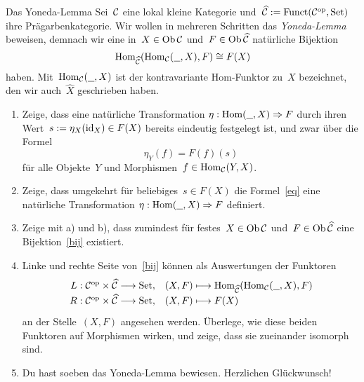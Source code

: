 \documentclass{pizzablatt}
\begin{document}

\begin{aufgabe}{Das Yoneda-Lemma}
Sei~$\mathcal{C}$ eine lokal kleine Kategorie und~$\widehat {\mathcal{C}} := \mathrm{Funct}(\mathcal{C}^{\mathrm{op}},\mathrm{Set})$
ihre Prägarbenkategorie. Wir wollen in mehreren Schritten das \emph{Yoneda-Lemma}
beweisen, demnach wir eine in~$X \in \operatorname{Ob} \mathcal{C}$ und~$F \in \operatorname{Ob} \widehat {\mathcal{C}}$
natürliche Bijektion
\begin{equation}\label{bij}\mathrm{Hom}_{\widehat{\mathcal{C}}}(\mathrm{Hom}_{\mathcal{C}}(\underline{\ \ }, X), F) \cong F(X)
\end{equation}
haben. Mit~$\mathrm{Hom}_{\mathcal{C}}(\underline{\ \ },X)$ ist der kontravariante Hom-Funktor zu~$X$
bezeichnet, den wir auch~$\widehat X$ geschrieben haben.
\begin{enumerate}
\item Zeige, dass eine natürliche Transformation $\eta : \mathrm{Hom}(\underline{\ \ }, X)
\Rightarrow F$ durch ihren Wert~$s := \eta_X(\mathrm{id}_X) \in F(X)$ bereits eindeutig
festgelegt ist, und zwar über die Formel
\begin{equation}\label{eq} \eta_Y(f) = F(f)(s) \end{equation}
für alle Objekte~$Y$ und Morphismen~$f \in \mathrm{Hom}_{\mathcal{C}}(Y,X)$.
\item Zeige, dass umgekehrt für beliebiges~$s \in F(X)$ die Formel~\eqref{eq} eine
natürliche Transformation $\eta : \mathrm{Hom}(\underline{\ \ }, X) \Rightarrow F$ definiert.
\item Zeige mit a) und b), dass zumindest für festes~$X \in \operatorname{Ob}\mathcal{C}$ und~$F \in
\operatorname{Ob}\widehat{\mathcal{C}}$ eine Bijektion~\eqref{bij} existiert.
\item Linke und rechte Seite von~\eqref{bij} können als Auswertungen der
Funktoren
\[ \renewcommand{\arraystretch}{1.3}\begin{array}{@{}rl@{}}
  L : \C^\op \times \widehat\C \longrightarrow \Set, &
  (X,F) \longmapsto \Hom_{\widehat\C}(\Hom_\C(\freist,X), F)
  \\
  R : \C^\op \times \widehat\C \longrightarrow \Set, &
  (X,F) \longmapsto F(X)
\end{array} \]
an der Stelle~$(X,F)$ angesehen werden. Überlege, wie diese beiden Funktoren auf
Morphismen wirken, und zeige, dass sie zueinander isomorph sind.
\item Du hast soeben das Yoneda-Lemma bewiesen. Herzlichen Glückwunsch!
\end{enumerate}
\end{aufgabe}
\end{document}
